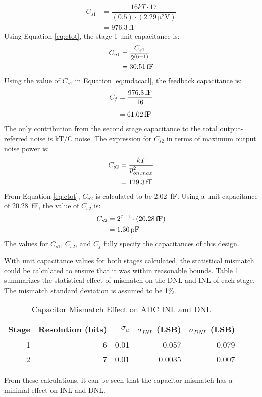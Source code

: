 \begin{align}
\label{eq:cs1size}
C_{s1} &= \dfrac{16kT\cdot 17}{(0.5)\cdot(\SI{2.29}{\square\micro\volt})} \\[0.5em]
\nonumber	&= \SI{976.3}{\femto\farad}
\end{align}
Using Equation \ref{eq:ctot}, the stage 1 unit capacitance is:
\begin{align}
\label{eq:cu1size}
C_{u1} &= \dfrac{C_{s1}}{2^{(6-1)}}\\
\nonu	&= \SI{30.51}{\femto\farad}
\end{align}
Using the value of $C_{s1}$ in Equation \ref{eq:mdacacl}, the feedback capacitance is:
\begin{align}
C_{f} &= \dfrac{\SI{976.3}{\femto\farad}}{16} \\[0.5em]
\nonu &= \SI{61.02}{\femto\farad}
\end{align}
The only contribution from the second stage capacitance to the total output-referred noise is kT/C noise. The expression for $C_{s2}$ in terms of maximum output noise power is:
\begin{align}
\label{eq:cs2sizetemp}
C_{s2} &= \dfrac{kT}{\overline{v}_{on,max}^2} \\
\nonu &= \SI{129.3}{\femto\farad}
\end{align}
From Equation \ref{eq:ctot}, $C_{u2}$ is calculated to be \SI{2.02}{\femto\farad}. Using a unit capacitance of \SI{20.28}{\femto\farad}, the value of $C_{s2}$ is:
\begin{align}
\label{eq:cu2size}
C_{s2} &= 2^{7-1}\cdot(\SI{20.28}{\femto\farad}) \\
\nonu	&= \SI{1.30}{\pico\farad}
\end{align}
The values for $C_{s1}$, $C_{s2}$, and $C_{f}$ fully specify the capacitances of this design.

With unit capacitance values for both stages calculated, the statistical mismatch could be calculated to ensure that it was within reasonable bounds. Table \ref{tab:capmismatch} summarizes the statistical effect of mismatch on the DNL and INL of each stage. The mismatch standard deviation is assumed to be 1\%.
\begin{table}[htbp]
\centering
\begin{tabular}{|r|r|r|r|r|}
\hline
Stage & Resolution (bits) & $\sigma_{u}$ & $\sigma_{INL}$ (LSB) & $\sigma_{DNL}$ (LSB) \\ \hline
1 & 6 & 0.01 & 0.057 & 0.079 \\ \hline
2 & 7 & 0.01 & 0.0035 & 0.007 \\ \hline
\end{tabular}
\caption{Capacitor Mismatch Effect on ADC INL and DNL}
\label{tab:capmismatch}
\end{table}
From these calculations, it can be seen that the capacitor mismatch has a minimal effect on INL and DNL.
